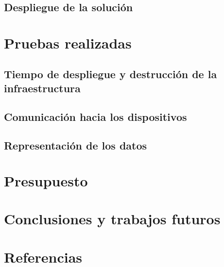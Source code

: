 \documentclass[12pt]{article}
\begin{document}
\subsection{Despliegue de la solución}


\section{Pruebas realizadas}

\subsection{Tiempo de despliegue y destrucción de la infraestructura}

\subsection{Comunicación hacia los dispositivos}

\subsection{Representación de los datos}




\section{Presupuesto}


\section{Conclusiones y trabajos futuros}


\newpage
\setcounter{secnumdepth}{0}
\section{Referencias}
\printbibliography[heading=none]
\end{document}
